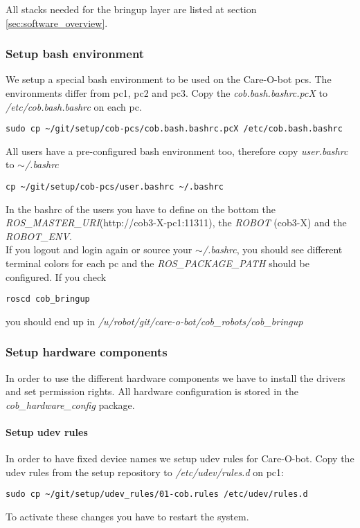 All stacks needed for the bringup layer are listed at section \ref{sec:software_overview}.

\subsubsection{Setup bash environment}
We setup a special bash environment to be used on the Care-O-bot pcs. The environments differ from pc1, pc2 and pc3. Copy the \textit{cob.bash.bashrc.pcX} to \textit{/etc/cob.bash.bashrc} on each pc.

\begin{lstlisting}
sudo cp ~/git/setup/cob-pcs/cob.bash.bashrc.pcX /etc/cob.bash.bashrc
\end{lstlisting}

All users have a pre-configured bash environment too, therefore copy \textit{user.bashrc} to \textit{$\sim$/.bashrc}
\begin{lstlisting}
cp ~/git/setup/cob-pcs/user.bashrc ~/.bashrc
\end{lstlisting}
In the bashrc of the users you have to define on the bottom the \textit{ROS\_MASTER\_URI}(http://cob3-X-pc1:11311), the \textit{ROBOT} (cob3-X) and the \textit{ROBOT\_ENV}.\\
If you logout and login again or source your \textit{$\sim$/.bashrc}, you should see different terminal colors for each pc and the \textit{ROS\_PACKAGE\_PATH} should be configured. If you check 
\begin{lstlisting}
roscd cob_bringup
\end{lstlisting}
you should end up in \textit{/u/robot/git/care-o-bot/cob\_robots/cob\_bringup}

\subsubsection{Setup hardware components}
In order to use the different hardware components we have to install the drivers and set permission rights. All hardware configuration is stored in the \textit{cob\_hardware\_config} package.

\paragraph{Setup udev rules}
In order to have fixed device names we setup udev rules for Care-O-bot. Copy the udev rules from the setup repository to \textit{/etc/udev/rules.d} on pc1:
\begin{lstlisting}
sudo cp ~/git/setup/udev_rules/01-cob.rules /etc/udev/rules.d
\end{lstlisting}
To activate these changes you have to restart the system.

